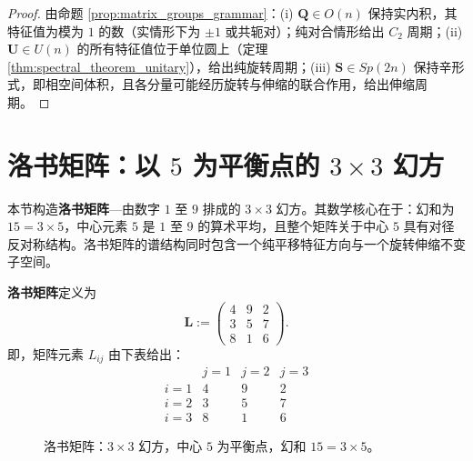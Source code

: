 \begin{proof}
由命题 \ref{prop:matrix_groups_grammar}：(i) $\mathbf{Q} \in O(n)$ 保持实内积，其特征值为模为 $1$ 的数（实情形下为 $\pm 1$ 或共轭对）；纯对合情形给出 $C_2$ 周期；(ii) $\mathbf{U} \in U(n)$ 的所有特征值位于单位圆上（定理 \ref{thm:spectral_theorem_unitary}），给出纯旋转周期；(iii) $\mathbf{S} \in Sp(2n)$ 保持辛形式，即相空间体积，且各分量可能经历旋转与伸缩的联合作用，给出伸缩周期。
\end{proof}

\section{\texorpdfstring{洛书矩阵：以 $5$ 为平衡点的 $3\times 3$ 幻方}{洛书矩阵}}
\label{sec:luoshu_matrix}

本节构造\textbf{洛书矩阵}---由数字 $1$ 至 $9$ 排成的 $3 \times 3$ 幻方。其数学核心在于：幻和为 $15 = 3 \times 5$，中心元素 $5$ 是 $1$ 至 $9$ 的算术平均，且整个矩阵关于中心 $5$ 具有对径反对称结构。洛书矩阵的谱结构同时包含一个纯平移特征方向与一个旋转伸缩不变子空间。

\begin{definition}[洛书矩阵]\label{def:luoshu_matrix}
\textbf{洛书矩阵}定义为
\[
\mathbf{L} := \begin{pmatrix}
4 & 9 & 2 \\
3 & 5 & 7 \\
8 & 1 & 6
\end{pmatrix}.
\]
即，矩阵元素 $L_{ij}$ 由下表给出：
\[
\begin{array}{c|ccc}
 & j=1 & j=2 & j=3 \\ \hline
i=1 & 4 & 9 & 2 \\
i=2 & 3 & 5 & 7 \\
i=3 & 8 & 1 & 6
\end{array}
\]
\end{definition}

\begin{figure}[htbp]
\centering
{}
\caption{洛书矩阵：$3\times 3$ 幻方，中心 $5$ 为平衡点，幻和 $15=3\times 5$。}
\label{fig:luoshu_matrix}
\end{figure}


